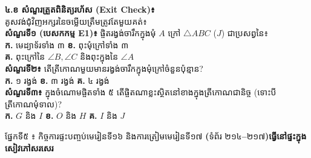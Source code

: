 \documentclass[a4paper,10pt]{article}
\newcommand{\en}[1]{{\TimesEn #1}}
\newcommand{\enbf}[1]{{\TimesEn\textbf{#1}}}
\newcommand{\tri}[1]{\ensuremath{\triangle #1}}
\newcommand{\ang}[1]{\ensuremath{\angle #1}}
\newcommand{\secbar}[2]{%
  \vspace{3pt}%
  \begin{tcolorbox}[
    enhanced, sharp corners, colback=headgray, colframe=black,
    boxrule=0.9pt, boxsep=1pt, top=2.5pt, bottom=2.5pt, left=6pt, right=6pt,
    after skip=3pt
  ]
    {\muol\fontsize{9.2pt}{13.5pt}\selectfont #1}\hfill{\fontsize{8.3pt}{11.5pt}\selectfont\textbf{#2}}
  \end{tcolorbox}%
}
\begin{document}
\begin{minipage}[t]{8.4cm}\vspace{0pt}
  \begin{tcolorbox}[
    enhanced, sharp corners, colback=white, colframe=black, equal height group=rowE5,
    boxrule=0.85pt, boxsep=2.5pt, top=4pt, bottom=4pt, left=5pt, right=5pt
  ]
    \textbf{៤.ខ សំណួរត្រួតពិនិត្យរហ័ស (\en{Exit Check})៖}\\
    គូសវង់ជុំវិញអក្សរនៃចម្លើយត្រឹមត្រូវតែមួយគត់៖\\[4.5pt]
    \textbf{សំណួរទី១ (បេសកកម្ម E1)៖} ផ្ចិតរង្វង់ចារឹកក្នុងមុំ $A$ ក្រៅ $\tri{ABC}$ ($J$) ជាប្រសព្វនៃ៖\\
    \hspace*{0.15cm}\textbf{ក.} មេដ្យាទ័រទាំង ៣ \hspace{0.35cm} \textbf{ខ.} ពុះមុំក្រៅទាំង ៣\\
    \hspace*{0.15cm}\textbf{គ.} ពុះក្រៅនៃ $\ang{B},\ang{C}$ និងពុះក្នុងនៃ $\ang{A}$\\[5.5pt]
    \textbf{សំណួរទី២៖} តើត្រីកោណមួយមានរង្វង់ចារឹកក្នុងមុំក្រៅចំនួនប៉ុន្មាន?\\
    \hspace*{0.15cm}\textbf{ក.} ១ រង្វង់ \hspace{0.55cm} \textbf{ខ.} ៣ រង្វង់ \hspace{0.55cm} \textbf{គ.} ៤ រង្វង់\\[5.5pt]
    \textbf{សំណួរទី៣៖} ក្នុងចំណោមផ្ចិតទាំង ៥ តើផ្ចិតណាខ្លះស្ថិតនៅខាងក្នុងត្រីកោណជានិច្ច (ទោះបីត្រីកោណមុំទាល)?\\
    \hspace*{0.15cm}\textbf{ក.} $G$ និង $I$ \hspace{0.45cm} \textbf{ខ.} $O$ និង $H$ \hspace{0.45cm} \textbf{គ.} $I$ និង $J$
  \end{tcolorbox}
\end{minipage}

\vspace{5pt}
\secbar{ផ្នែកទី៥ ៖ កិច្ចការផ្ទះបញ្ចប់មេរៀនទី១៦ និងការត្រៀមមេរៀនទី១៧ \enbf{(}ទំព័រ ២១៤\enbf{--}២១៧\enbf{)}}{ធ្វើនៅផ្ទះក្នុងសៀវភៅសរសេរ}
\end{document}
